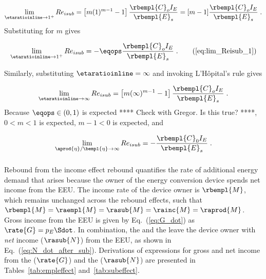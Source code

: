 \begin{equation}
  \lim_{\etaratioinline \to 1^{+}} Re_{isub} 
        = \left[ m ( 1 )^{m-1} - 1 \right] \frac{\rbempl{C}_o I_E}{\rbempl{E}_s}
        = [m - 1] \frac{\rbempl{C}_o I_E}{\rbempl{E}_s} \; .
\end{equation}
%
Substituting for $m$ gives

\begin{equation}
  \lim_{\etaratioinline \to 1^{+}} Re_{isub} 
        = -\eqops \frac{\rbempl{C}_o I_E}{\rbempl{E}_s} \; . \tag{\ref{eq:lim_Reisub_1}}
\end{equation}

Similarly, 
substituting $\etaratioinline = \infty$ and invoking L'H\^{o}pital's rule gives

\begin{equation}
  \lim_{\etaratioinline \to \infty} Re_{isub} 
        = \left[ m ( \infty )^{m-1} - 1 \right] \frac{\rbempl{C}_o I_E}{\rbempl{E}_s} \; .
\end{equation}
%
Because $\eqops \in (0, 1)$ is expected **** Check with Gregor.  Is this true? ****,
$0 < m < 1$ is expected, $m - 1 < 0$ is expected, and

\begin{equation}
  \lim_{\aprod{\eta}/\bempl{\eta} \to \infty} Re_{isub} = -\frac{\rbempl{C}_0 I_E}{\rbempl{E}_s} \; .
\end{equation}


\subsubsection{\Inceffect{}} 
\label{sec:Re_inc}

Rebound from the income effect rebound quantifies the rate of additional energy demand 
that arises because the owner of the energy conversion device spends net
income from the EEU.
The income rate of the device owner is $\rbempl{M}$, 
which remains unchanged across the rebound effects, 
such that
$\rbempl{M} = \raempl{M} = \rasub{M} = \rainc{M} = \raprod{M}$.
Gross income from the EEU is given by Eq.~(\ref{eq:G_dot})
as $\rate{G} = p_E \Sdot$. 
In combination, the \empleffect{} and the \subeffect{} leave the device owner with
\emph{net} income ($\rasub{N}$) from the EEU,
as shown in Eq.~(\ref{eq:N_dot_after_sub}).
Derivations of expressions for gross and net income from the 
\empleffect{} ($\rate{G}$) and the \subeffect{} ($\rasub{N}$)
are presented in Tables~\ref{tab:empleffect} and~\ref{tab:subeffect}.

